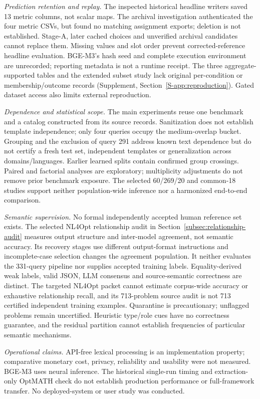 \documentclass[pdflatex,sn-basic,Numbered]{sn-jnl}
\begin{document}
\emph{Prediction retention and replay.} The inspected historical headline writers saved 13 metric columns, not scalar maps. The archival investigation authenticated the four metric CSVs, but found no matching assignment exports; deletion is not established. Stage-A, later cached choices and unverified archival candidates cannot replace them. Missing values and slot order prevent corrected-reference headline evaluation. BGE-M3's hash seed and complete execution environment are unrecorded; reporting metadata is not a runtime receipt. The three aggregate-supported tables and the extended subset study lack original per-condition or membership/outcome records (Supplement, Section~\ref{S-app:reproduction}). Gated dataset access also limits external reproduction.

\emph{Dependence and statistical scope.} The main experiments reuse one benchmark and a catalog constructed from its source records. Sanitization does not establish template independence; only four queries occupy the medium-overlap bucket. Grouping and the exclusion of query 291 address known text dependence but do not certify a fresh test set, independent templates or generalization across domains/languages. Earlier learned splits contain confirmed group crossings. Paired and factorial analyses are exploratory; multiplicity adjustments do not remove prior benchmark exposure. The selected 60/269/20 and common-18 studies support neither population-wide inference nor a harmonized end-to-end comparison.

\emph{Semantic supervision.} No formal independently accepted human reference set exists. The selected NL4Opt relationship audit in Section~\ref{subsec:relationship-audit} measures output structure and inter-model agreement, not semantic accuracy. Its recovery stages use different output-format instructions and incomplete-case selection changes the agreement population. It neither evaluates the 331-query pipeline nor supplies accepted training labels. Equality-derived weak labels, valid JSON, LLM consensus and source-semantic correctness are distinct. The targeted NL4Opt packet cannot estimate corpus-wide accuracy or exhaustive relationship recall, and its 713-problem source audit is not 713 certified independent training examples. Quarantine is precautionary; unflagged problems remain uncertified. Heuristic type/role cues have no correctness guarantee, and the residual partition cannot establish frequencies of particular semantic mechanisms.

\emph{Operational claims.} API-free lexical processing is an implementation property; comparative monetary cost, privacy, reliability and usability were not measured. BGE-M3 uses neural inference. The historical single-run timing and extraction-only OptMATH check do not establish production performance or full-framework transfer. No deployed-system or user study was conducted.
\end{document}
